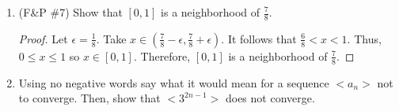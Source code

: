\documentclass{article}
\theoremstyle{problem}
\theoremstyle{plain}
\theoremstyle{remark}
\begin{document}
\begin{enumerate}
\item (F\&P \#7) Show that $[0,1]$ is a neighborhood of $\frac{7}{8}$.
  \begin{proof}
    Let $\epsilon = \frac{1}{8}$. 
    Take $x \in (\frac{7}{8} - \epsilon, \frac{7}{8} + \epsilon)$.
    It follows that $ \frac{6}{8} < x < 1$. 
    Thus, $0 \leq x \leq 1$ so $x \in [0,1]$. 
    Therefore, $[0,1]$ is a neighborhood of $\frac{7}{8}$.
  \end{proof}
\item Using no negative words say what it would mean for a sequence $<a_n>$ not to converge. Then, show that $<3^{2n-1}>$ does not converge.

  
\end{enumerate}
\end{document}
